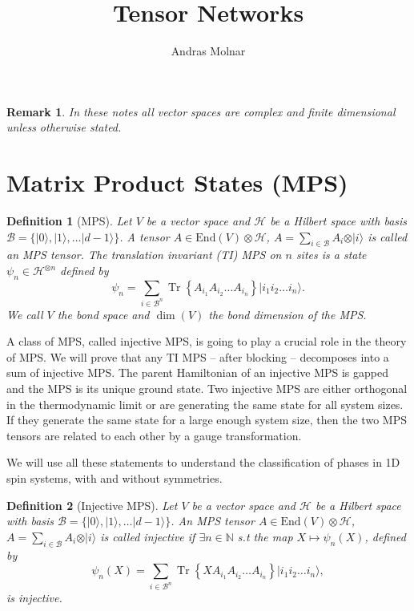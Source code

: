 \documentclass{article}
\title{Tensor Networks}
\author{Andras Molnar}
\newtheorem{remark}{Remark}
\newtheorem{definition}{Definition}
\newcommand{\tr}{\operatorname{Tr}}
\newcommand{\End}{\mathrm{End}}
\newcommand{\ket}[1]{\vert #1 \rangle}
\begin{document}
\maketitle

\begin{remark}
	In these notes all vector spaces are complex and finite dimensional unless otherwise stated.
\end{remark}


\section{Matrix Product States (MPS)}

\begin{definition}[MPS]
  Let $V$ be a vector space and $\mathcal{H}$ be a Hilbert space with basis $\mathcal{B} = \{\ket{0},\ket{1},\dots \ket{d-1}\}$. A tensor $A\in \End(V)\otimes \mathcal{H}$, $A = \sum_{i\in \mathcal{B}} A_i \otimes \ket{i}$ is called an MPS tensor. The translation invariant (TI) MPS on $n$ sites is a state $\psi_n\in \mathcal{H}^{\otimes n}$ defined by
  \begin{equation*}
  	\psi_n = \sum_{i\in \mathcal{B}^n} \tr\left\{A_{i_1} A_{i_2} \dots A_{i_n}\right\} \ket{i_1 i_2 \dots i_n}.
  \end{equation*}
  We call $V$ the bond space and $\dim(V)$ the bond dimension of the MPS.
\end{definition}

A class of MPS, called injective MPS, is going to play a crucial role in the theory of MPS. We will prove that any TI MPS -- after blocking -- decomposes into a sum of injective MPS. The parent Hamiltonian of an injective MPS is gapped and the MPS is its unique ground state. Two injective MPS are either orthogonal in the thermodynamic limit or are generating the same state for all system sizes. If they generate the same state for a large enough system size, then the two MPS tensors are related to each other by a gauge transformation. 

We will use all these statements to understand the classification of phases in 1D spin systems, with and without symmetries.

\begin{definition}[Injective MPS]
  Let $V$ be a vector space and $\mathcal{H}$ be a Hilbert space with basis $\mathcal{B} = \{\ket{0},\ket{1},\dots \ket{d-1}\}$. An MPS tensor $A\in \End(V)\otimes \mathcal{H}$, $A = \sum_{i\in \mathcal{B}} A_i \otimes \ket{i}$ is called \emph{injective} if $\exists n\in\mathbb{N}$ s.t the map $X\mapsto \psi_n(X)$, defined by
  \begin{equation*}
    \psi_n(X) = \sum_{i\in \mathcal{B}^n} \tr\left\{XA_{i_1} A_{i_2} \dots A_{i_n}\right\} \ket{i_1 i_2 \dots i_n},
  \end{equation*}
  is injective.
\end{definition}
\end{document}
